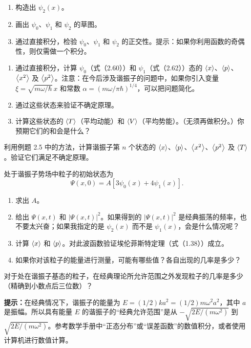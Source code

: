 \begin{enumerate}
\item 构造出 $\psi_2(x)$。
\item 画出 $\psi_0$、$\psi_1$ 和 $\psi_2$ 的草图。
\item 通过直接积分，检验 $\psi_0$、$\psi_1$ 和 $\psi_2$ 的正交性。提示：如果你利用函数的奇偶性，则仅需做一个积分。
\end{enumerate}
\vfill

\begin{enumerate}
\item 通过直接积分，计算 $\psi_0$（式（2.60））和 $\psi_1$（式（2.62））态的 $\left\langle x\right\rangle$、$\left\langle p\right\rangle$、$\left\langle x^2\right\rangle$ 及 $\left\langle p^2\right\rangle$。注意：在今后涉及谐振子的问题中，如果你引入变量 $\xi=\sqrt{m\omega/\hbar}\,x$ 和常数 $\alpha=(m\omega/\pi\hbar)^{1/4}$，可以把问题简化。
\item 通过这些状态来验证不确定原理。
\item 计算这些状态的 $\left\langle T\right\rangle$（平均动能）和 $\left\langle V\right\rangle$（平均势能）。（无须再做积分。）你预期它们的和会是什么？
\end{enumerate}
\vfill

利用例题 2.5 中的方法，计算谐振子第 $n$ 个状态的 $\left\langle x\right\rangle$、$\left\langle p\right\rangle$、$\left\langle x^2\right\rangle$、$\left\langle p^2\right\rangle$ 及 $\left\langle T\right\rangle$。验证它们满足不确定原理。
\vfill

处于谐振子势场中粒子的初始状态为
\[
\Psi(x,0)=A[3\psi_0(x)+4\psi_1(x)].
\]
\begin{enumerate}
\item 求出 $A$。
\item 给出 $\Psi(x,t)$ 和 $|\Psi(x,t)|^2$。如果得到的 $|\Psi(x,t)|^2$ 是经典振荡的频率，也不要太兴奋；如果我指定的是 $\psi_2(x)$ 而不是 $\psi_1(x)$，会是什么情况呢？
\item 计算 $\left\langle x\right\rangle$ 和 $\left\langle p\right\rangle$。对此波函数验证埃伦菲斯特定理（式（1.38））成立。
\item 如果你对该粒子的能量进行测量，可能有哪些值？各自出现的几率是多少？
\end{enumerate}
\vfill

对于处在谐振子基态的粒子，在经典理论所允许范围之外发现粒子的几率是多少（精确到小数点后三位数）？

\textbf{提示：}在经典情况下，谐振子的能量为 $E=(1/2)ka^2=(1/2)m\omega^2a^2$，其中 $a$ 是振幅。所以具有能量 $E$ 的谐振子的“经典允许范围”是从 $-\sqrt{2E/(m\omega^2)}$ 到 $\sqrt{2E/(m\omega^2)}$。参考数学手册中“正态分布”或“误差函数”的数值积分，或者使用计算机进行数值计算。
\vfill

